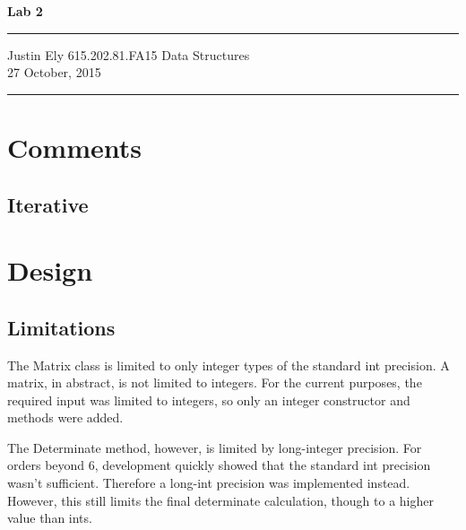 \documentclass[a4paper,12pt]{article}
\begin{document}
\begin{flushright}

\vspace{1.1cm}

{\bf\Huge Lab 2}

\rule{0.25\linewidth}{0.5pt}

\vspace{0.5cm}
Justin Ely
\linebreak
\newline
\footnotesize{615.202.81.FA15 Data Structures \\}
\vspace{0.5cm}
27 October, 2015
\end{flushright}

\noindent\rule{\linewidth}{1.0pt}


\section{Comments}

\subsection{Iterative}



\section{Design}

\subsection{Limitations}
The Matrix class is limited to only integer types of the standard int precision.  A matrix, in abstract, is not limited to integers.  
For the current purposes, the required input was limited to integers, so only an integer constructor and methods were added. 

The Determinate method, however, is limited by long-integer precision.  For orders beyond 6, development quickly showed that
the standard int precision wasn't sufficient.  Therefore a long-int precision was implemented instead.  However, this still limits the final
determinate calculation, though to a higher value than ints.  
\end{document}
